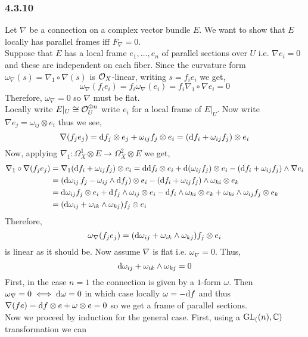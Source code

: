 \documentclass[12pt]{article}
\begin{document}
\subsubsection{4.3.10}

Let $\nabla$ be a connection on a complex vector bundle $E$. We want to show that $E$ locally has parallel frames iff $F_\nabla = 0$.
\bigskip\\
Suppose that $E$ has a local frame $e_1, \dots, e_n$ of parallel sections over $U$ i.e. $\nabla e_i = 0$ and these are independent on each fiber. Since the curvature form $\omega_\nabla(s) = \nabla_1 \circ \nabla(s)$ is $\mathcal{O}_{X}$-linear, writing $s = f_i e_i$ we get, 
\[ \omega_\nabla(f_i e_i) = f_i \omega_\nabla(e_i) = f_i \nabla_1 \circ \nabla e_i = 0 \]
Therefore, $\omega_\nabla = 0$ so $\nabla$ must be flat.
\bigskip\\
Locally write $E|_U \cong \mathcal{O}_{U}^{\oplus n}$ write $e_i$ for a local frame of $E|_U$. Now write $\nabla e_j = \omega_{ij} \otimes e_i$ thus we see,
\[ \nabla (f_j e_j) = \mathrm{d}{f_j} \otimes e_j + \omega_{ij} f_j \otimes e_i = ( \mathrm{d}{f_i} + \omega_{ij} f_j) \otimes e_i \] 
Now, applying $\nabla_1 : \Omega^1_X \otimes E \to \Omega^2_X \otimes E$ we get,
\begin{align*}
\nabla_1 \circ \nabla (f_j e_j) & = \nabla_1 (\mathrm{d}{f_i} + \omega_{ij} f_j) \otimes e_i = \mathrm{d}{\mathrm{d}{f_i}} \otimes e_i + \mathrm{d}{(\omega_{ij} f_j)} \otimes e_i - (\mathrm{d}{f_i} + \omega_{ij} f_j) \wedge \nabla e_i 
\\
& = (\mathrm{d}{\omega_{ij}} \, f_j - \omega_{ij} \wedge \mathrm{d}{f_j}) \otimes e_i - (\mathrm{d}{f_i} + \omega_{ij} f_j) \wedge \omega_{ki} \otimes e_k
\\
& = \mathrm{d}{\omega_{ij}} f_j \otimes e_i + \mathrm{d}{f_j} \wedge \omega_{ij} \otimes e_i - \mathrm{d}{f_i} \wedge \omega_{ki} \otimes e_k + \omega_{ki} \wedge \omega_{ij} f_j \otimes e_k
\\
& = (\mathrm{d}{\omega_{ij}} + \omega_{ik} \wedge \omega_{kj}) f_j \otimes e_i
\end{align*}
Therefore,
\[ \omega_\nabla(f_j e_j) = (\mathrm{d}{\omega_{ij}} + \omega_{ik} \wedge \omega_{kj}) f_j \otimes e_i \]
is linear as it should be. Now assume $\nabla$ is flat i.e. $\omega_\nabla = 0$. Thus,
\[ \mathrm{d}{\omega_{ij}} + \omega_{ik} \wedge \omega_{kj} = 0 \] 
First, in the case $n = 1$ the connection is given by a $1$-form $\omega$. Then $\omega_\nabla = 0 \iff \mathrm{d}{\omega} = 0$ in which case locally $\omega = - \mathrm{d}{f}$ and thus $\nabla (fe) = \mathrm{d}{f} \otimes e + \omega \otimes e = 0$ so we get a frame of parallel sections.
\bigskip\\
Now we proceed by induction for the general case. First, using a $\mathrm{GL}_{(}(n), \mathbb{C})$ transformation we can 
\end{document}
